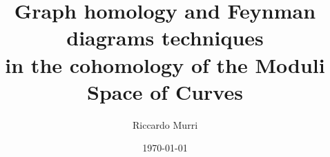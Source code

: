 

\title{%
  Graph homology and Feynman diagrams techniques \\
  in the cohomology of the Moduli Space of Curves
}
\date{\today}
\author{Riccardo Murri}
\address{%
  The Abdus Salam I.C.T.P. \\
  strada Costiera, 11 \\
  34014 Trieste \\
  Italy
}

\maketitle

\setcounter{tocdepth}{2} %

\tableofcontents

